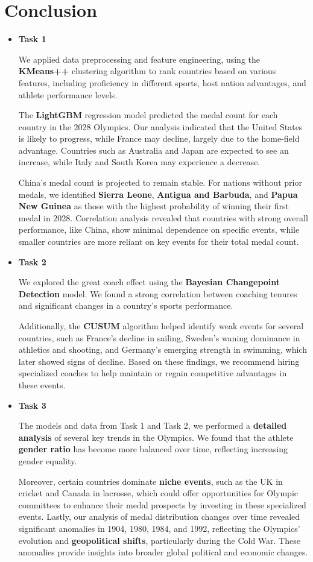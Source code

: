\documentclass[12pt]{article}  %
\begin{document}
\section{Conclusion}
\begin{itemize}
		\item \textbf{Task 1}
		

We applied data preprocessing and feature engineering, using the \textbf{KMeans++} clustering algorithm\cite{3} to rank countries based on various features, including proficiency in different sports, host nation advantages, and athlete performance levels.

The \textbf{LightGBM} regression model predicted the medal count for each country in the 2028 Olympics. Our analysis indicated that the United States is likely to progress, while France may decline, largely due to the home-field advantage. Countries such as Australia and Japan are expected to see an increase, while Italy and South Korea may experience a decrease.

China's medal count is projected to remain stable. For nations without prior medals, we identified \textbf{Sierra Leone}, \textbf{Antigua and Barbuda}, and \textbf{Papua New Guinea} as those with the highest probability of winning their first medal in 2028. Correlation analysis revealed that countries with strong overall performance, like China, show minimal dependence on specific events, while smaller countries are more reliant on key events for their total medal count.
	

	\item \textbf{Task 2}

We explored the great coach effect using the \textbf{Bayesian Changepoint Detection} model. We found a strong correlation between coaching tenures and significant changes in a country's sports performance.
 
Additionally, the \textbf{CUSUM} algorithm helped identify weak events for several countries, such as France's decline in sailing, Sweden's waning dominance in athletics and shooting, and Germany's emerging strength in swimming, which later showed signs of decline. Based on these findings, we recommend hiring specialized coaches to help maintain or regain competitive advantages in these events.
	\item \textbf{Task 3}
	
The models and data from Task 1 and Task 2, we performed a \textbf{detailed analysis} of several key trends in the Olympics. We found that the athlete \textbf{gender ratio} has become more balanced over time, reflecting increasing gender equality.
 
Moreover, certain countries dominate \textbf{niche events}, such as the UK in cricket and Canada in lacrosse, which could offer opportunities for Olympic committees to enhance their medal prospects by investing in these specialized events. Lastly, our analysis of medal distribution changes over time revealed significant anomalies in 1904, 1980, 1984, and 1992, reflecting the Olympics' evolution and \textbf{geopolitical shifts}, particularly during the Cold War. These anomalies provide insights into broader global political and economic changes.
\end{itemize}
\end{document}
